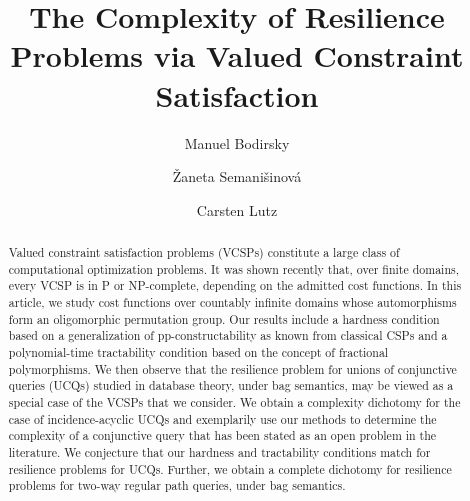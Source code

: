 \documentclass[nonacm]{acmart}
\begin{document}
\title{The Complexity of Resilience Problems via Valued Constraint Satisfaction}

\author{Manuel Bodirsky}
\author{\v{Z}aneta Semani\v{s}inov\'{a}}

\author{Carsten Lutz}


\renewcommand{\shortauthors}{Manuel Bodirsky, \v{Z}aneta Semani\v{s}inov\'{a} and Carsten Lutz}

\begin{abstract}
Valued constraint satisfaction problems (VCSPs) constitute a large class of computational optimization problems. It was shown recently that, over finite domains, every VCSP is in P or NP-complete, depending on the admitted cost functions. In this article, we study cost functions over countably infinite domains whose automorphisms form an oligomorphic permutation group. Our results include a hardness condition based on a generalization of pp-constructability as known from classical CSPs and a polynomial-time tractability condition based on the concept of fractional polymorphisms.  We then observe that the resilience problem for unions of conjunctive queries (UCQs) studied in database theory, under bag semantics, may be viewed as a special case of the VCSPs that we consider. We obtain a complexity dichotomy for the case of incidence-acyclic UCQs and exemplarily use our methods to determine the complexity of a conjunctive query that has been stated as an open problem in the literature. We conjecture that our hardness and tractability conditions match for resilience problems for UCQs. Further, we obtain a complete dichotomy for resilience problems for two-way regular path queries, under bag semantics.
\end{abstract}
\end{document}
